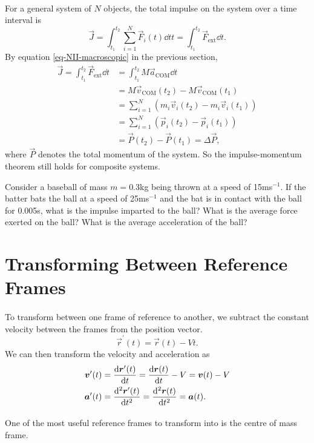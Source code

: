 \documentclass[../classical_mechanics.tex]{subfiles}
\begin{document}
        \paragraph{}
        For a general system of $N$ objects, the total impulse on the system over a time interval is
        \begin{equation}
            \vec{J}=\int_{t_1}^{t_2}\sum_{i=1}^N\vec{F}_i(t)\dd{t}t=\int_{t_1}^{t_2}\vec{F}_\text{ext}\dd{t}.
        \end{equation}
        By equation \ref{eq-NII-macroscopic} in the previous section,
        \begin{align}
            \vec{J}=\int_{t_1}^{t_2}\vec{F}_\text{ext}\dd{t}&=\int_{t_1}^{t_2}M\vec{a}_\text{COM}\dd{t}\\
            &=M\vec{v}_\text{COM}(t_2)-M\vec{v}_\text{COM}(t_1)\\
            &=\sum_{i=1}^N\left(m_i\vec{v}_i(t_2)-m_i\vec{v}_i(t_1)\right)\\
            &=\sum_{i=1}^N\left(\vec{p}_i(t_2)-\vec{p}_i(t_1)\right)\\
            &=\vec{P}(t_2)-\vec{P}(t_1)=\Delta\vec{P},
        \end{align}
        where $\vec{P}$ denotes the total momentum of the system.
        So the impulse-momentum theorem still holds for composite systems.
        \begin{example}
            Consider a baseball of mass $m=$0.3kg being thrown at a speed of 15ms$^{-1}$.
            If the batter bats the ball at a speed of 25ms$^{-1}$ and the bat is in contact with the ball for 0.005s, what is the impulse imparted to the ball?
            What is the average force exerted on the ball? What is the average acceleration of the ball?
        \end{example}

    \section{Transforming Between Reference Frames}
        \paragraph{}
        To transform between one frame of reference to another, we subtract the constant velocity between the frames from the position vector.
        \begin{equation}
            \vec{r}^\prime(t)=\vec{r}(t)-Vt.
        \end{equation}
        We can then transform the velocity and acceleration as
        \begin{align}
            \vec{v}^\prime(t)&=\dv{\vec{r}^\prime(t)}{t}=\dv{\vec{r}(t)}{t}-V=\vec{v}(t)-V\\
            \vec{a}^\prime(t)&=\dv[2]{\vec{r}^\prime(t)}{t}=\dv[2]{\vec{r}(t)}{t}=\vec{a}(t).
        \end{align}

        \paragraph{}
        One of the most useful reference frames to transform into is the centre of mass frame.
\end{document}

